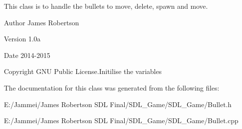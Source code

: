This class is to handle the bullets to move, delete, spawn and move. \begin{DoxyAuthor}{Author}
James Robertson 
\end{DoxyAuthor}
\begin{DoxyVersion}{Version}
1.\+0a 
\end{DoxyVersion}
\begin{DoxyDate}{Date}
2014-\/2015 
\end{DoxyDate}
\begin{DoxyCopyright}{Copyright}
G\+N\+U Public License.\+Initilise the variables 
\end{DoxyCopyright}


The documentation for this class was generated from the following files\+:\begin{DoxyCompactItemize}
\item 
E\+:/\+Jammei/\+James Robertson S\+D\+L Final/\+S\+D\+L\+\_\+\+Game/\+S\+D\+L\+\_\+\+Game/Bullet.\+h\item 
E\+:/\+Jammei/\+James Robertson S\+D\+L Final/\+S\+D\+L\+\_\+\+Game/\+S\+D\+L\+\_\+\+Game/Bullet.\+cpp\end{DoxyCompactItemize}
